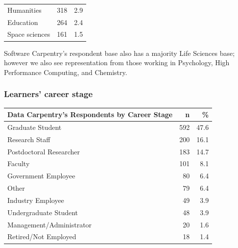 \documentclass[]{article}
\begin{document}
\begin{longtable}[]{@{}lrr@{}}
\begin{minipage}[t]{0.81\columnwidth}\raggedright\strut
Humanities\strut
\end{minipage} & \begin{minipage}[t]{0.05\columnwidth}\raggedleft\strut
318\strut
\end{minipage} & \begin{minipage}[t]{0.05\columnwidth}\raggedleft\strut
2.9\strut
\end{minipage}\tabularnewline
\begin{minipage}[t]{0.81\columnwidth}\raggedright\strut
Education\strut
\end{minipage} & \begin{minipage}[t]{0.05\columnwidth}\raggedleft\strut
264\strut
\end{minipage} & \begin{minipage}[t]{0.05\columnwidth}\raggedleft\strut
2.4\strut
\end{minipage}\tabularnewline
\begin{minipage}[t]{0.81\columnwidth}\raggedright\strut
Space sciences\strut
\end{minipage} & \begin{minipage}[t]{0.05\columnwidth}\raggedleft\strut
161\strut
\end{minipage} & \begin{minipage}[t]{0.05\columnwidth}\raggedleft\strut
1.5\strut
\end{minipage}\tabularnewline
\bottomrule
\end{longtable}

Software Carpentry's respondent base also has a majority Life Sciences
base; however we also see representation from those working in
Psychology, High Performance Computing, and Chemistry.

\subsubsection{Learners' career stage}\label{learners-career-stage}

\begin{longtable}[]{@{}lrr@{}}
\toprule
Data Carpentry's Respondents by Career Stage & n & \%\tabularnewline
\midrule
\endhead
Graduate Student & 592 & 47.6\tabularnewline
Research Staff & 200 & 16.1\tabularnewline
Postdoctoral Researcher & 183 & 14.7\tabularnewline
Faculty & 101 & 8.1\tabularnewline
Government Employee & 80 & 6.4\tabularnewline
Other & 79 & 6.4\tabularnewline
Industry Employee & 49 & 3.9\tabularnewline
Undergraduate Student & 48 & 3.9\tabularnewline
Management/Administrator & 20 & 1.6\tabularnewline
Retired/Not Employed & 18 & 1.4\tabularnewline
\bottomrule
\end{longtable}
\end{document}
